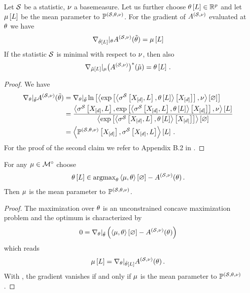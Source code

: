 \begin{lemma}
    \label{lem:gradientCumfunction}
    Let $\mathcal{S}$ be a statistic, $\nu$ a basemeasure.
    Let us further choose $\theta\left[L\right]\in\mathbb{R}^{p}$ and let $\mu\left[L\right]$ be the mean parameter to $\mathbb{P}^{(\mathcal{S},\theta,\nu)}$.
    For the gradient of $A^{(\mathcal{S},\nu)}$ evaluated at $\theta$ we have
    \begin{align*}
        \nabla_{\tilde{\theta}\left[L\right]}|_{\theta} A^{(\mathcal{S},\nu)}(\tilde{\theta}) = \mu\left[L\right]
    \end{align*}
    If the statistic $\mathcal{S}$ is minimal with respect to $\nu$, then also
    \begin{align*}
        \nabla_{\tilde{\mu}\left[L\right]}|_{\mu} \big(A^{(\mathcal{S},\nu)}\big)^*(\tilde{\mu})
        = \theta\left[L\right] \, .
    \end{align*}
\end{lemma}
\begin{proof}
    We have
    \begin{align*}
        \nabla_{\theta}|_{\tilde{\theta}} A^{(\mathcal{S},\nu)}(\tilde{\theta})
        & = \nabla_{\theta}|_{\tilde{\theta}} \ln \left[ \left\langle \mathrm{exp}\left[\left\langle \sigma^{\mathcal{S}}\left[X_{[d]},L\right],\theta\left[L\right]\right\rangle \left[ X_{[d]} \right]\right],\nu\right\rangle \left[ \varnothing \right] \right] \\
        & = \frac{
            \left\langle \sigma^{\mathcal{S}}\left[X_{[d]},L\right],\mathrm{exp}\left[\left\langle \sigma^{\mathcal{S}}\left[X_{[d]},L\right],\theta\left[L\right]\right\rangle \left[ X_{[d]} \right]\right],\nu\right\rangle \left[ L \right]
        }{\left\langle \mathrm{exp}\left[\left\langle \sigma^{\mathcal{S}}\left[X_{[d]},L\right],\theta\left[L\right]\right\rangle \left[ X_{[d]} \right]\right]\right\rangle \left[ \varnothing \right]}  \\
        & = \left\langle \mathbb{P}^{(\mathcal{S},\theta,\nu)}\left[X_{[d]}\right],\sigma^{\mathcal{S}}\left[X_{[d]},L\right]\right\rangle \left[ L \right] \, .
    \end{align*}
    For the proof of the second claim we refer to Appendix B.2 in \cite{wainwright_graphical_2008}.
\end{proof}

\begin{theorem}
    For any $\mu\in{\mathcal{M}}^{\circ}$ choose
    \begin{align*}
        \theta\left[L\right] \in \mathrm{argmax}_{\theta} \left\langle \mu,\theta\right\rangle \left[ \varnothing \right] - A^{(\mathcal{S},\nu)}(\theta) \, .
    \end{align*}
    Then $\mu$ is the mean parameter to $\mathbb{P}^{(\mathcal{S},\theta,\nu)}$.
\end{theorem}
\begin{proof}
    The maximization over $\theta$ is an unconstrained concave maximization problem and the optimum is characterized by
    \begin{align*}
        0 = \nabla_{\theta}|_{\tilde{\theta}}\left(\left\langle \mu,\theta\right\rangle \left[ \varnothing \right] - A^{(\mathcal{S},\nu)}(\theta)\right)
    \end{align*}
    which reads
    \begin{align*}
        \mu\left[L\right] = \nabla_{\theta}|_{\tilde{\theta}[L]} A^{(\mathcal{S},\nu)}(\theta) \, .
    \end{align*}
    With , the gradient vanishes if and only if $\mu$ is the mean parameter to $\mathbb{P}^{(\mathcal{S},\theta,\nu)}$.
\end{proof}

